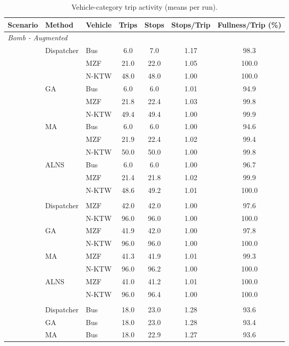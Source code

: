\begin{table}[h]
\centering
\caption{Vehicle-category trip activity (means per run).}
\label{tab:vehicle_type_trips}
\begin{tabular}{lllcccc}
\toprule
\textbf{Scenario} & \textbf{Method} & \textbf{Vehicle} & \textbf{Trips} & \textbf{Stops} & \textbf{Stops/Trip} & \textbf{Fullness/Trip (\%)} \\
\midrule
\multicolumn{7}{l}{\textit{Bomb - Augmented}} \\
 & Dispatcher & Bus & 6.0 & 7.0 & 1.17 & 98.3 \\
 &  & MZF & 21.0 & 22.0 & 1.05 & 100.0 \\
 &  & N-KTW & 48.0 & 48.0 & 1.00 & 100.0 \\
 & GA & Bus & 6.0 & 6.0 & 1.01 & 94.9 \\
 &  & MZF & 21.8 & 22.4 & 1.03 & 99.8 \\
 &  & N-KTW & 49.4 & 49.4 & 1.00 & 99.9 \\
 & MA & Bus & 6.0 & 6.0 & 1.00 & 94.6 \\
 &  & MZF & 21.9 & 22.4 & 1.02 & 99.4 \\
 &  & N-KTW & 50.0 & 50.0 & 1.00 & 99.8 \\
 & ALNS & Bus & 6.0 & 6.0 & 1.00 & 96.7 \\
 &  & MZF & 21.4 & 21.8 & 1.02 & 99.9 \\
 &  & N-KTW & 48.6 & 49.2 & 1.01 & 100.0 \\
\addlinespace
\multicolumn{7}{l}{\textit{Bomb - Specialized}} \\
 & Dispatcher & MZF & 42.0 & 42.0 & 1.00 & 97.6 \\
 &  & N-KTW & 96.0 & 96.0 & 1.00 & 100.0 \\
 & GA & MZF & 41.9 & 42.0 & 1.00 & 97.8 \\
 &  & N-KTW & 96.0 & 96.0 & 1.00 & 100.0 \\
 & MA & MZF & 41.3 & 41.9 & 1.01 & 99.3 \\
 &  & N-KTW & 96.0 & 96.2 & 1.00 & 100.0 \\
 & ALNS & MZF & 41.0 & 41.2 & 1.01 & 100.0 \\
 &  & N-KTW & 96.0 & 96.4 & 1.00 & 100.0 \\
\addlinespace
\multicolumn{7}{l}{\textit{Synthetic Mass Transit}} \\
 & Dispatcher & Bus & 18.0 & 23.0 & 1.28 & 93.6 \\
 & GA & Bus & 18.0 & 23.0 & 1.28 & 93.4 \\
 & MA & Bus & 18.0 & 22.9 & 1.27 & 93.6 \\

\end{tabular}
\end{table}
